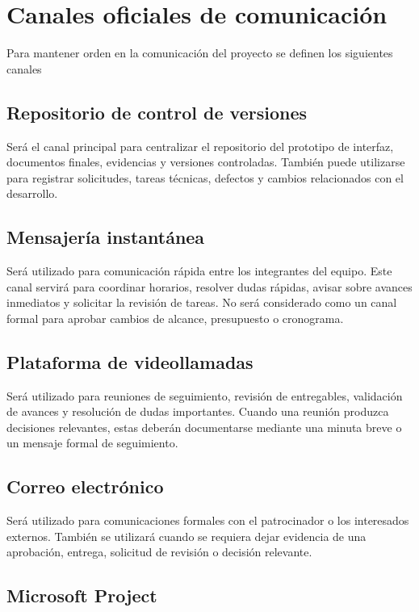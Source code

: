 \documentclass[11pt,spanish]{article}
\begin{document}
\section{Canales oficiales de comunicación}

Para mantener orden en la comunicación del proyecto se definen los siguientes canales

\subsection{Repositorio de control de versiones}

Será el canal principal para centralizar el repositorio del prototipo de interfaz, documentos finales, evidencias y versiones controladas. También puede utilizarse para registrar solicitudes, tareas técnicas, defectos y cambios relacionados con el desarrollo.

\subsection{Mensajería instantánea}

Será utilizado para comunicación rápida entre los integrantes del equipo. Este canal servirá para coordinar horarios, resolver dudas rápidas, avisar sobre avances inmediatos y solicitar la revisión de tareas. No será considerado como un canal formal para aprobar cambios de alcance, presupuesto o cronograma.

\subsection{Plataforma de videollamadas}

Será utilizado para reuniones de seguimiento, revisión de entregables, validación de avances y resolución de dudas importantes. Cuando una reunión produzca decisiones relevantes, estas deberán documentarse mediante una minuta breve o un mensaje formal de seguimiento.

\subsection{Correo electrónico}

Será utilizado para comunicaciones formales con el patrocinador o los interesados externos. También se utilizará cuando se requiera dejar evidencia de una aprobación, entrega, solicitud de revisión o decisión relevante.

\subsection{Microsoft Project}
\end{document}
